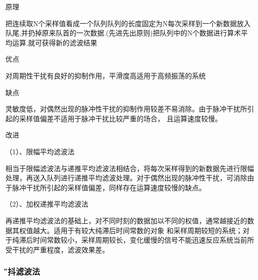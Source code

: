 \documentclass[12pt,a4paper]{article} %
\begin{document}
 		\begin{compactitem} 
 			\item 原理
 			\par 把连续取N个采样值看成一个队列队列的长度固定为N每次采样到一个新数据放入队尾,并扔掉原来队首的一次数据.(先进先出原则)把队列中的N个数据进行算术平均运算,就可获得新的滤波结果
			
			\item 优点
			\par 对周期性干扰有良好的抑制作用，平滑度高适用于高频振荡的系统 
			
			\item 缺点
			\par 灵敏度低，对偶然出现的脉冲性干扰的抑制作用较差不易消除。由于脉冲干扰所引起的采样值偏差不适用于脉冲干扰比较严重的场合，
 且运算速度较慢。
 			\item 改进
 			\par （1）、限幅平均滤波法
 			\par 相当于限幅滤波法与递推平均滤波法相结合，将每次采样得到的新数据先进行限幅处理，再送入队列进行递推平均滤波处理。对于偶然出现的脉冲性干扰，可消除由于脉冲干扰所引起的采样值偏差，同样存在运算速度较慢的缺点。
 			\par （2）、加权递推平均滤波法
 			\par 再递推平均滤波法的基础上，对不同时刻的数据加以不同的权值，通常越接近的数据其权值越大。适用于有较大纯滞后时间常数的对象
和采样周期较短的系统；对于纯滞后时间常数较小，采样周期较长，变化缓慢的信号不能迅速反应系统当前所受干扰的严重程度，滤波效果差。
			
		 \end{compactitem}	
 		
 		\subsubsection{\H 消抖滤波法} 
\end{document}
